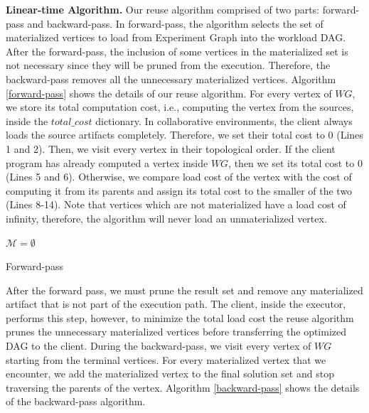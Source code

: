 \textbf{Linear-time Algorithm.}
Our reuse algorithm comprised of two parts: forward-pass and backward-pass.
In forward-pass, the algorithm selects the set of materialized vertices to load from Experiment Graph into the workload DAG.
After the forward-pass, the inclusion of some vertices in the materialized set is not necessary since they will be pruned from the execution.
Therefore, the backward-pass removes all the unnecessary materialized vertices.
Algorithm \ref{forward-pass} shows the details of our reuse algorithm.
For every vertex of $WG$, we store its total computation cost, i.e., computing the vertex from the sources, inside the $total\_cost$ dictionary.
In collaborative environments, the client always loads the source artifacts completely.
Therefore, we set their total cost to 0 (Lines 1 and 2).
Then, we visit every vertex in their topological order.
If the client program has already computed a vertex inside $WG$, then we set its total cost to 0 (Lines 5 and 6).
Otherwise, we compare load cost of the vertex with the cost of computing it from its parents and assign its total cost to the smaller of the two (Lines 8-14).
Note that vertices which are not materialized have a load cost of infinity, therefore, the algorithm will never load an unmaterialized vertex.

\begin{algorithm}[h]
$\mathcal{M} = \emptyset$\;
\caption{Forward-pass}\label{forward-pass}
\end{algorithm}
After the forward pass, we must prune the result set and remove any materialized artifact that is not part of the execution path.
The client, inside the executor, performs this step, however, to minimize the total load cost the reuse algorithm prunes the unnecessary materialized vertices before transferring the optimized DAG to the client.
During the backward-pass, we visit every vertex of $WG$ starting from the terminal vertices.
For every materialized vertex that we encounter, we add the materialized vertex to the final solution set and stop traversing the parents of the vertex.
Algorithm \ref{backward-pass} shows the details of the backward-pass algorithm.

